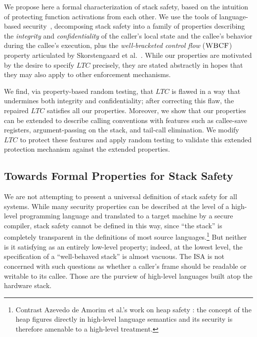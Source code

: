 \documentclass[10pt,conference]{ieeetran}%
\theoremstyle{definition}
\begin{document}
We propose here a formal characterization of stack safety, based on
the intuition of protecting function activations from each other.
We use the tools of language-based
security~\cite{sabelfeld2003language}, decomposing stack safety into a family of
properties describing
the {\em integrity} and {\em confidentiality} of the caller’s local state
and the callee's behavior during the callee's execution, plus the
{\em well-bracketed control flow} (\(\textnormal{\sc WBCF}\)) property articulated by
Skorstengaard et al.~\cite{SkorstengaardSTKJFP}.
While our properties are motivated by the desire to specify \(LTC\) precisely,
they are stated abstractly in hopes that they may also apply
to other enforcement mechanisms.

We find, via property-based random testing, that \(LTC\) is flawed in
a way that undermines both integrity and confidentiality; after
correcting this flaw, the repaired \(LTC\) satisfies all our
properties.  Moreover, we show that our properties can be extended to
describe calling conventions with features such as callee-save
registers, argument-passing on the stack, and tail-call
elimination. We modify \(LTC\) to protect these features and apply
random testing to validate this extended protection mechanism against
the extended properties.

\subsection {Towards Formal Properties for Stack Safety}

We are not attempting to present a universal definition of stack safety
for all systems. While many security properties can be described at
the level of a high-level programming language and translated to a
target machine by a secure compiler, stack safety cannot be defined in
this way, since ``the stack'' is completely transparent in the
definitions of most source languages.\footnote{Contrast Azevedo de
  Amorim et al.'s work on heap safety
  \cite{DBLP:conf/post/AmorimHP18}: the concept of the heap figures
  directly in high-level language semantics and its security is
  therefore amenable to a high-level treatment.}
%
But neither is it satisfying as an entirely low-level property;
indeed, at the lowest level, the specification of a ``well-behaved
stack'' is almost vacuous. The ISA is not concerned with such
questions as whether a caller's frame should be readable or writable
to its callee. Those are the purview of high-level languages built
atop the hardware stack.
\end{document}
